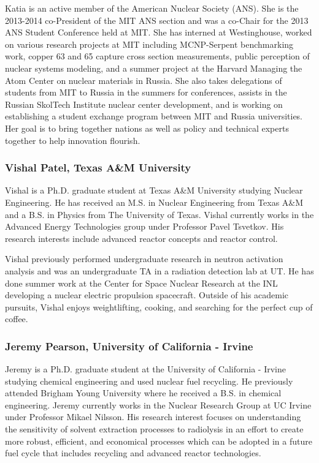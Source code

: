 Katia is an active member of the American Nuclear Society (ANS). She is the
2013-2014 co-President of the MIT ANS section and was a co-Chair for the 2013
ANS Student Conference held at MIT. She has interned at Westinghouse, worked on
various research projects at MIT including MCNP-Serpent benchmarking work,
copper 63 and 65 capture cross section measurements, public perception of
nuclear systems modeling, and a summer project at the Harvard Managing the Atom
Center on nuclear materials in Russia. She also takes delegations of students
from MIT to Russia in the summers for conferences, assists in the Russian
SkolTech Institute nuclear center development, and is working on establishing a
student exchange program between MIT and Russia universities. Her goal is to
bring together nations as well as policy and technical experts together to help
innovation flourish.

\subsubsection*{Vishal Patel, Texas A\&M University}

Vishal is a Ph.D. graduate student at Texas A\&M University studying Nuclear
Engineering. He has received an M.S. in Nuclear Engineering from Texas A\&M and
a B.S. in Physics from The University of Texas. Vishal currently works in the
Advanced Energy Technologies group under Professor Pavel Tsvetkov. His research
interests include advanced reactor concepts and reactor control.

Vishal previously performed undergraduate research in neutron activation
analysis and was an undergraduate TA in a radiation detection lab at UT. He has
done summer work at the Center for Space Nuclear Research at the INL developing
a nuclear electric propulsion spacecraft. Outside of his academic pursuits,
Vishal enjoys weightlifting, cooking, and searching for the perfect cup of
coffee.

\subsubsection*{Jeremy Pearson, University of California - Irvine}

Jeremy is a Ph.D. graduate student at the University of California - Irvine
studying chemical engineering and used nuclear fuel recycling. He previously
attended Brigham Young University where he received a B.S. in chemical
engineering. Jeremy currently works in the Nuclear Research Group at UC Irvine
under Professor Mikael Nilsson. His research interest focuses on understanding
the sensitivity of solvent extraction processes to radiolysis in an effort to
create more robust, efficient, and economical processes which can be adopted in
a future fuel cycle that includes recycling and advanced reactor technologies.

